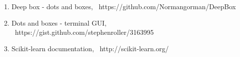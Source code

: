 \documentclass[10pt,a4paper]{article}
\begin{document}
\begin{enumerate}
\renewcommand*\labelenumi{[\theenumi]}

\item Deep box - dots and boxes, \ {https://github.com/Normangorman/DeepBox}
\label{deepBox}
\item Dots and boxes - terminal GUI, \ {https://gist.github.com/stephenroller/3163995}
\label{GUI} 
\item Scikit-learn documentation, \ http://scikit-learn.org/
\label{skLearnDoc}



\end{enumerate}
\end{document}
